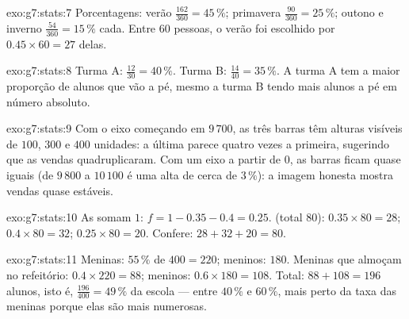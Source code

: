 \begin{solution}{exo:g7:stats:7}
Porcentagens: verão $\frac{162}{360} = 45\,\%$; primavera
$\frac{90}{360} = 25\,\%$; outono e inverno $\frac{54}{360} = 15\,\%$
cada. Entre $60$ pessoas, o verão foi escolhido por
$0.45 \times 60 = 27$ delas.
\end{solution}

\begin{solution}{exo:g7:stats:8}
Turma A: $\frac{12}{30} = 40\,\%$. Turma B: $\frac{14}{40} = 35\,\%$. A
turma A tem a maior proporção de alunos que vão a pé, mesmo a turma B
tendo mais alunos a pé em número absoluto.
\end{solution}

\begin{solution}{exo:g7:stats:9}
Com o eixo começando em $9\,700$, as três barras têm alturas visíveis
de $100$, $300$ e $400$ unidades: a última parece quatro vezes a
primeira, sugerindo que as vendas quadruplicaram. Com um eixo a partir
de $0$, as barras ficam quase iguais (de $9\,800$ a $10\,100$ é uma
alta de cerca de $3\,\%$): a imagem honesta mostra vendas quase
estáveis.
\end{solution}

\begin{solution}{exo:g7:stats:10}
As  somam $1$: $f = 1 - 0.35 - 0.4 = 0.25$.
 (total $80$): $0.35 \times 80 = 28$;
$0.4 \times 80 = 32$; $0.25 \times 80 = 20$. Confere:
$28 + 32 + 20 = 80$.
\end{solution}

\begin{solution}{exo:g7:stats:11}
Meninas: $55\,\%$ de $400 = 220$; meninos: $180$. Meninas que almoçam
no refeitório: $0.4 \times 220 = 88$; meninos: $0.6 \times 180 = 108$.
Total: $88 + 108 = 196$ alunos, isto é, $\frac{196}{400} = 49\,\%$ da
escola --- entre $40\,\%$ e $60\,\%$, mais perto da taxa das meninas
porque elas são mais numerosas.
\end{solution}


